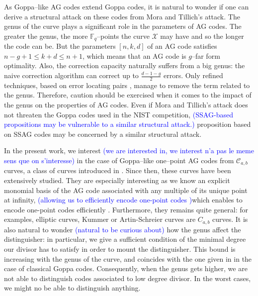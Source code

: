 \documentclass[a4paper]{article}
\theoremstyle{definition}
\theoremstyle{remark}
\newcommand{\calC}{\mathcal{C}}
\newcommand{\calX}{\mathcal{X}}
\newcommand{\F}{\mathbb{F}}
\newcommand\sabira[1]{\textcolor{blue}{#1}}
\begin{document}
As Goppa--like AG codes extend Goppa codes, it is natural to wonder if one can derive a structural attack on these codes from Mora and Tillich's attack. The genus of the curve plays a significant role in the parameters of AG codes. The greater the genus, the more $\F_q$--points the curve $\calX$ may have and so the longer the code can be. But the parameters $[n,k,d]$ of an AG code satisfies $n-g+1 \leq k+d \leq n+1$, which means that an AG code is $g$--far form optimality. Also, the correction capacity naturally suffers from a big genus: the naive correction algorithm can correct up to $\frac{d-1-g}{2}$ errors. Only refined techniques, based on error locating pairs \cite{CP20}, manage to remove the term related to the genus. Therefore, caution should be exercised when it comes to the impact of the genus on the properties of AG codes.
Even if Mora and Tillich's attack does not threaten the Goppa codes used in the NIST competition, \sabira{(SSAG-based propositions may be vulnerable to a similar structural attack.)} proposition based on SSAG codes may be concerned by a similar structural attack. 

In the present work, we interest \sabira{(we are interested in, we interest n'a pas le meme sens que on s'interesse)}  in the case of Goppa--like one--point AG codes from $\calC_{a,b}$ curves, a class of curves introduced in \cite{Miu93}. Since then, these curves have been extensively studied. They are especially interesting as we know an explicit monomial basis of the AG code associated with any multiple of its unique point at infinity, \sabira{(allowing us to efficiently encode one-point codes )}which enables to encode one-point codes efficiently \cite{BRS21}. Furthermore, they remains quite general: for examples, elliptic curves, Kummer or Artin-Schreier curves are $C_{a,b}$ curves. It is also natural to wonder \sabira{(natural to be curious about)} how the genus affect the distinguisher: in particular, we give a sufficient condition of the minimal degree our divisor has to satisfy in order to mount the distinguisher. This bound is increasing with the genus of the curve, and coincides with the one given in \cite{MT21} in the case of classical Goppa codes. Consequently, when the genus gets higher, we are not able to distinguish codes associated to low degree divisor. In the worst cases, we might no be able to distinguish anything.
\end{document}
